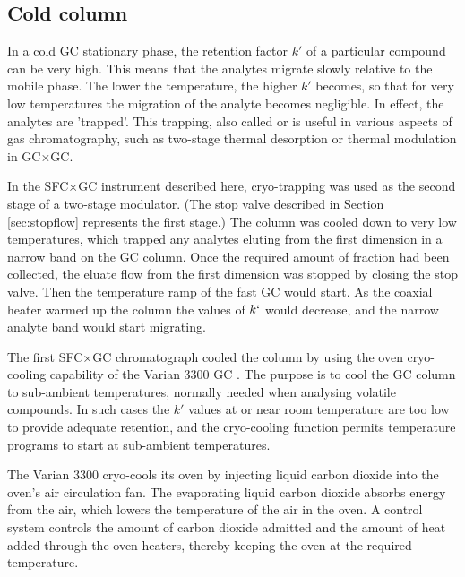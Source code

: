 \subsection{Cold column}
\label{sec:ColdColumn}

In a cold GC stationary phase, the retention factor \(k'\) of a particular
compound can be very high. This means that the analytes migrate slowly relative
to the mobile phase. The lower the temperature, the higher \(k'\) becomes, so
that for very low temperatures the migration of the analyte becomes negligible.
In effect, the analytes are 'trapped'. This trapping, also called
 or  is useful in various aspects
of gas chromatography, such as two-stage thermal desorption or thermal
modulation in GC×GC.


In the SFC×GC instrument described here, cryo-trapping was used as the second
stage of a two-stage modulator. (The stop valve described in Section
\ref{sec:stopflow} represents the first stage.) The column was cooled down to
very low temperatures, which trapped any analytes eluting from the first
dimension in a narrow band on the GC column. Once the required amount of
fraction had been collected, the eluate flow from the first dimension was
stopped by closing the stop valve. Then the temperature ramp of the fast GC
would start. As the coaxial heater warmed up the column the values of \(k`\)
would decrease, and the narrow analyte band would start migrating.

The first SFC×GC chromatograph cooled the column by using the oven cryo-cooling
capability of the Varian 3300 GC \autocite{Venter2004, Venter2003}. The purpose
is to cool the GC column to sub-ambient temperatures, normally needed when
analysing volatile compounds. In such cases the \(k'\) values at or near room
temperature are too low to provide adequate retention, and the cryo-cooling
function permits temperature programs to start at sub-ambient temperatures.

The Varian 3300 cryo-cools its oven by injecting liquid carbon dioxide into the
oven's air circulation fan. The evaporating liquid carbon dioxide absorbs energy
from the air, which lowers the temperature of the air in the oven. A control
system controls the amount of carbon dioxide admitted and the amount of heat
added through the oven heaters, thereby keeping the oven at the required
temperature.

